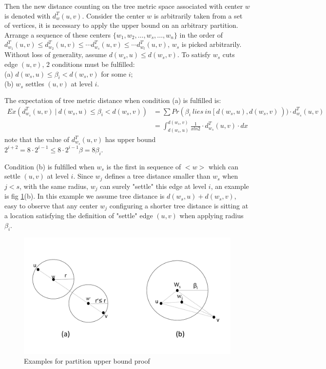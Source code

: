 \documentclass[11pt,twocolumn]{IEEEtran}
\begin{document}
Then the new distance counting on the tree metric space associated with center $w$ is denoted with $d_w^T(u,v)$.
Consider the center $w$ is arbitrarily taken from a set of vertices, it is necessary
to apply the upper bound on an arbitrary partition. Arrange a sequence of these centers $\{w_1, w_2, \dots, w_s,\dots, w_n\}$ in the order of $d_{w_1}^T(u,v) \leq d_{w_2}^T(u,v)\leq\cdots d_{w_s}^T(u,v)\leq \cdots d_{w_t}^T(u,v)$, $w_s$ is picked arbitrarily. Without loss of generality, assume $d(w_s,u)\leq d(w_s,v)$.
To satisfy $w_s$ cuts edge $(u,v)$, 2 conditions must be fulfilled:\\
(a) $d(w_s,u) \leq \beta_i < d(w_s,v)$ for some $i$;\\
(b) $w_s$ settles $(u,v)$ at level $i$.

The expectation of tree metric distance when condition (a) is fulfilled is:
\begin{align}
Ex\left(d_{w_s}^T(u,v)\ |\ d(w_s,u) \leq \beta_i < d(w_s,v)\right) &= \sum Pr(\beta_i\ lies\ in\ [\ d(w_s,u),d(w_s,v)\ ))\cdot d_{w_s}^T(u,v)\nonumber\\
&= \int_{d(w_s,u)}^{d(w_s,v)}\frac{1}{xln2}\cdot d_{w_s}^T(u,v)\cdot dx\nonumber
\end{align} 
note that the value of $d_{w_s}^T(u,v)$ has upper bound $2^{i+2} = 8\cdot 2^{i-1}\leq 8\cdot 2^{i-1}\beta = 8\beta_i$.

Condition (b) is fulfilled when $w_s$ is the first in sequence of $<w>$ which can settle $(u,v)$
at level $i$. Since $w_j$ defines a tree distance smaller than $w_s$ when $j<s$, with the same radius,
 $w_j$ can surely "settle" this edge at level $i$, an example is fig \ref{fig:distance}(b). In this
 example we assume tree distance is $d(w_s,u)+d(w_s,v)$, easy to observe that any center $w_j$
 configuring a shorter tree distance is sitting at a location satisfying the definition of
 "settle" edge $(u,v)$ when applying radius $\beta_i$.
 
 \begin{figure}[hbt]
	\begin{center}
	\includegraphics[scale=0.4]{fig_distance.pdf}
	\end{center}
	\caption{Examples for partition upper bound proof}
	\label{fig:distance}
\end{figure}
 
\end{document}

